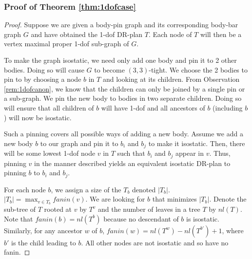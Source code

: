 \subsubsection{Proof of Theorem \ref{thm:1dofcase}}
\begin{proof}
    Suppose we are given a body-pin graph and its corresponding body-bar graph $G$ and have obtained the 1-dof DR-plan $T$. Each node of $T$ will then be a vertex maximal proper 1-dof sub-graph of $G$.

    To make the graph isostatic, we need only add one body and pin it to 2 other bodies. Doing so will cause $G$ to become $(3,3)$-tight. We choose the 2 bodies to pin to by choosing a node $b$ in $T$ and looking at its children. From Observation \ref{rem:1dofcanon}, we know that the children can only be joined by a single pin or a sub-graph. We pin the new body to bodies in two separate children. Doing so will ensure that all children of $b$ will have 1-dof and all ancestors of $b$ (including $b$) will now be isostatic.


    Such a pinning covers all possible ways of adding a new body. Assume we add a new body $b$ to our graph and pin it to $b_i$ and $b_j$ to make it isostatic. Then, there will be some lowest 1-dof node $v$ in $T$ such that $b_i$ and $b_j$ appear in $v$. Thus, pinning $v$ in the manner described yields an equivalent isostatic DR-plan to pinning $b$ to $b_i$ and $b_j$.

    For each node $b$, we assign a size of the $T_b$ denoted $|T_b|$. $|T_b| = \displaystyle\max_{v \in T_b} fanin(v)$. We are looking for $b$ that minimizes $|T_b|$. Denote the sub-tree of $T$ rooted at $v$ by $T^v$ and the number of leaves in a tree $T$ by $nl(T)$. Note that $fanin(b)= nl(T^b)$ because no descendant of $b$ is isostatic. Similarly, for any ancestor $w$ of $b$, $fanin(w) = nl(T^w)-nl(T^{b'})+1$, where $b'$ is the child leading to $b$. All other nodes are not isostatic and so have no fanin.


\end{proof}
